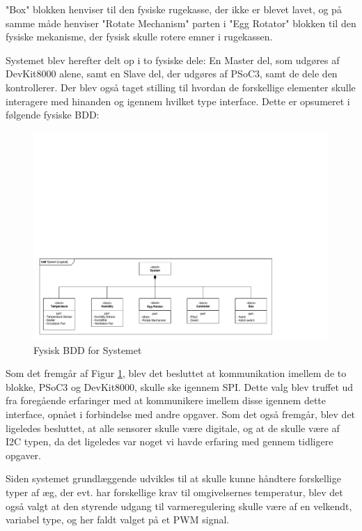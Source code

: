 "Box" blokken henviser til den fysiske rugekasse, der ikke er blevet lavet, og på samme måde henviser "Rotate Mechanism" parten i "Egg Rotator" blokken til den fysiske mekanisme, der fysisk skulle rotere emner i rugekassen.

Systemet blev herefter delt op i to fysiske dele: En Master del, som udgøres af DevKit8000 alene, samt en Slave del, der udgøres af PSoC3, samt de dele den kontrollerer. Der blev også taget stilling til hvordan de forskellige elementer skulle interagere med hinanden og igennem hvilket type interface. Dette er opsumeret i følgende fysiske BDD:

\begin{figure}[H]
\centering
\includegraphics[page=2,width=\linewidth,trim=5mm 5mm 210mm 20mm]{./7_projektbeskrivelse/systemarkitektur/diagrammer/SYSML_Diagrammer_v4.pdf}
\caption[Diagram]{Fysisk BDD for Systemet}
\label{fig:BDDFysisk}
\end{figure}

Som det fremgår af Figur \ref{fig:BDDFysisk}, blev det besluttet at kommunikation imellem de to blokke, PSoC3 og DevKit8000, skulle ske igennem SPI. Dette valg blev truffet ud fra foregående erfaringer med at kommunikere imellem disse igennem dette interface, opnået i forbindelse med andre opgaver. Som det også fremgår, blev det ligeledes besluttet, at alle sensorer skulle være digitale, og at de skulle være af I2C typen, da det ligeledes var noget vi havde erfaring med gennem tidligere opgaver.

Siden systemet grundlæggende udvikles til at skulle kunne håndtere forskellige typer af æg, der evt. har forskellige krav til omgivelsernes temperatur, blev det også valgt at den styrende udgang til varmeregulering skulle være af en velkendt, variabel type, og her faldt valget på et PWM signal.

